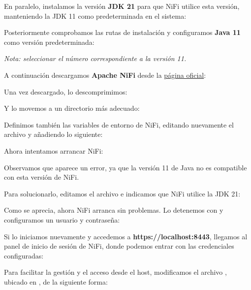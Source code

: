 \documentclass{../../miPlantilla}
\begin{document}

\newpage

En paralelo, instalamos la versión \textbf{JDK 21} para que NiFi utilice esta versión, manteniendo la JDK 11 como predeterminada en el sistema:


Posteriormente comprobamos las rutas de instalación y configuramos \textbf{Java 11} como versión predeterminada:


\textit{Nota: seleccionar el número correspondiente a la versión 11.}


A continuación descargamos \textbf{Apache NiFi} desde la \href{https://nifi.apache.org/}{página oficial}:


Una vez descargado, lo descomprimimos:


Y lo movemos a un directorio más adecuado:


Definimos también las variables de entorno de NiFi, editando nuevamente el archivo  y añadiendo lo siguiente:


Ahora intentamos arrancar NiFi:


Observamos que aparece un error, ya que la versión 11 de Java no es compatible con esta versión de NiFi.

\newpage

Para solucionarlo, editamos el archivo  e indicamos que NiFi utilice la JDK 21:


Como se aprecia, ahora NiFi arranca sin problemas. Lo detenemos con  y configuramos un usuario y contraseña:


Si lo iniciamos nuevamente y accedemos a \textbf{https://localhost:8443}, llegamos al panel de inicio de sesión de NiFi, donde podemos entrar con las credenciales configuradas:


\newpage

Para facilitar la gestión y el acceso desde el host, modificamos el archivo , ubicado en , de la siguiente forma:
\end{document}

